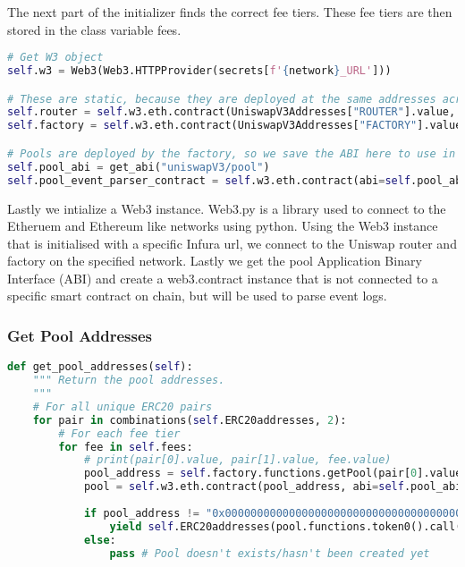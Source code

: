 The next part of the initializer finds the correct fee tiers. These fee tiers are then stored in the class variable fees.

\begin{lstlisting}[language=python]
# Get W3 object
self.w3 = Web3(Web3.HTTPProvider(secrets[f'{network}_URL']))

# These are static, because they are deployed at the same addresses across networks
self.router = self.w3.eth.contract(UniswapV3Addresses["ROUTER"].value, abi=get_abi("uniswapV3/router"))
self.factory = self.w3.eth.contract(UniswapV3Addresses["FACTORY"].value, abi=get_abi("uniswapV3/factory"))

# Pools are deployed by the factory, so we save the ABI here to use in the future.
self.pool_abi = get_abi("uniswapV3/pool")
self.pool_event_parser_contract = self.w3.eth.contract(abi=self.pool_abi)
\end{lstlisting}

Lastly we intialize a Web3 instance. Web3.py is a library used to connect to the Etheruem and Ethereum like networks using python. Using the Web3 instance that is initialised with a specific Infura url, we connect to the Uniswap router and factory on the specified network. Lastly we get the pool Application Binary Interface (ABI) and create a web3.contract instance that is not connected to a specific smart contract on chain, but will be used to parse event logs.


\subsubsection{Get Pool Addresses} \label{getpooladd}
\begin{lstlisting}[language=python]
def get_pool_addresses(self):
    """ Return the pool addresses. 
    """
    # For all unique ERC20 pairs
    for pair in combinations(self.ERC20addresses, 2):
        # For each fee tier
        for fee in self.fees:
            # print(pair[0].value, pair[1].value, fee.value)
            pool_address = self.factory.functions.getPool(pair[0].value, pair[1].value, fee.value).call()
            pool = self.w3.eth.contract(pool_address, abi=self.pool_abi)
            
            if pool_address != "0x0000000000000000000000000000000000000000":
                yield self.ERC20addresses(pool.functions.token0().call()).name, self.ERC20addresses(pool.functions.token1().call()).name, fee, pool_address
            else:
                pass # Pool doesn't exists/hasn't been created yet
\end{lstlisting}


